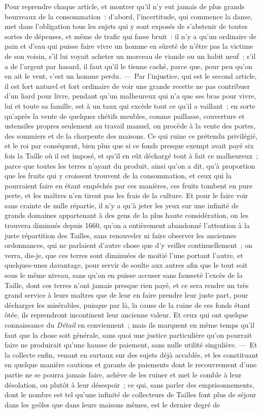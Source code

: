 \documentclass[french,twoside]{book} %
\begin{document}
Pour reprendre chaque article, et montrer qu’il n’y eut jamais de plus grands bourreaux de la consommation : d’abord, l’incertitude, qui commence la danse, met dans l’obligation tous les sujets qui y sont exposés de s’abstenir de toutes sortes de dépenses, et même de trafic qui fasse bruit : il n’y a qu’un ordinaire de pain et d’eau qui puisse faire vivre un homme en sûreté de n’être pas la victime de son voisin, s’il lui voyait acheter un morceau de viande ou un habit neuf ; s’il a de l’argent par hasard, il faut qu’il le tienne caché, parce que, pour peu qu’on en ait le vent, c’est un homme perdu. — Par l’injustice, qui est le second article, il est fort naturel et fort ordinaire de voir une grande recette ne pas contribuer d’un liard pour livre, pendant qu’un malheureux qui n’a que ses bras pour vivre, lui et toute sa famille, est à un taux qui excède tout ce qu’il a vaillant ; en sorte qu’après la vente de quelques chétifs meubles, comme paillasse, couverture et ustensiles propres seulement au travail manuel, on procède à la vente des portes, des sommiers et de la charpente des maisons. Ce qui ruine ce prétendu privilégié, et le roi par conséquent, bien plus que si ce fonds presque exempt avait payé six fois la Taille où il est imposé, et qu’il en eût déchargé tout à fait ce malheureux ; parce que toutes les terres n’ayant du produit, ainsi qu’on a dit, qu’à proportion que les fruits qui y croissent trouvent de la consommation, et ceux qui la pourraient faire en étant empêchés par ces manières, ces fruits tombent en pure perte, et les maîtres n’en tirent pas les frais de la culture. Et pour le faire voir sans crainte de nulle répartie, il n’y a qu’à jeter les yeux sur une infinité de grands domaines appartenant à des gens de la plus haute considération, on les trouvera diminués depuis 1660, qu’on a entièrement abandonné l’attention à la juste répartition des Tailles, sans renouveler ni faire observer les anciennes ordonnances, qui ne parlaient d’autre chose que d’y veiller continuellement ; on verra, dis-je, que ces terres sont diminuées de moitié l’une portant l’autre, et quelques-unes davantage, pour servir de soulte aux autres afin que le tout soit sous le même niveau, sans qu’on en puisse accuser sans fausseté l’excès de la Taille, dont ces terres n’ont jamais presque rien payé, et ce sera rendre un très grand service à leurs maîtres que de leur en faire prendre leur juste part, pour décharger les misérables, puisque par là, la cause de la ruine de ces fonds étant ôtée, ils reprendront incontinent leur ancienne valeur. Et ceux qui ont quelque connaissance du {\itshape Détail} en conviennent ; mais ils marquent en même temps qu’il faut que la chose soit générale, sans quoi une justice particulière qu’on pourrait faire ne produirait qu’une hausse de paiement, sans nulle utilité singulière. — Et la collecte enfin, venant en surtaux sur des sujets déjà accablés, et les constituant en quelque manière cautions et garants de paiements dont le recouvrement d’une partie ne se pourra jamais faire, achève de les ruiner et met le comble à leur désolation, ou plutôt à leur désespoir ; ce qui, sans parler des emprisonnements, dont le nombre est tel qu’une infinité de collecteurs de Tailles font plus de séjour dans les geôles que dans leurs maisons mêmes, est le dernier degré de 
\end{document}
